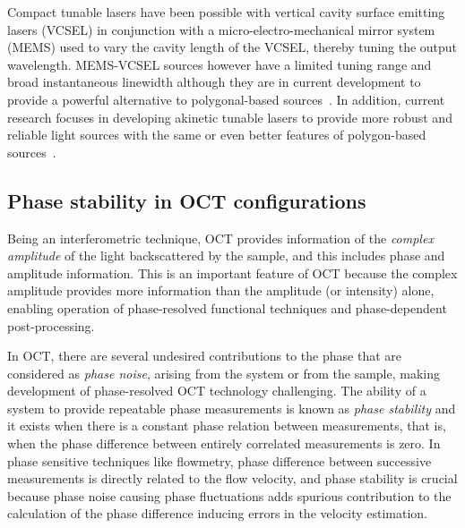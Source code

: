 Compact tunable lasers have been possible with vertical cavity surface emitting lasers (VCSEL) in conjunction with a micro-electro-mechanical mirror system (MEMS) used to vary the cavity length of the VCSEL, thereby tuning the output wavelength. MEMS-VCSEL sources however have a limited tuning range and broad instantaneous linewidth although they are in current development to provide a powerful alternative to polygonal-based sources~\cite{}. In addition, current research focuses in developing akinetic tunable lasers to provide more robust and reliable light sources with the same or even better features of polygon-based sources~\cite{}.

\subsection{Phase stability in OCT configurations}

Being an interferometric technique, OCT provides information of the \textit{complex amplitude} of the light backscattered by the sample, and this includes phase and amplitude information. This is an important feature of OCT because the complex amplitude provides more information than the amplitude (or intensity) alone, enabling operation of phase-resolved functional techniques and phase-dependent post-processing.

In OCT, there are several undesired contributions to the phase that are considered as \textit{phase noise}, arising from the system or from the sample, making development of phase-resolved OCT technology challenging. The ability of a system to provide repeatable phase measurements is known as \textit{phase stability} and it exists when there is a constant phase relation between measurements, that is, when the phase difference between entirely correlated measurements is zero. In phase sensitive techniques like flowmetry, phase difference between successive measurements is directly related to the flow velocity, and phase stability is crucial because phase noise causing phase fluctuations adds spurious contribution to the calculation of the phase difference inducing errors in the velocity estimation.

